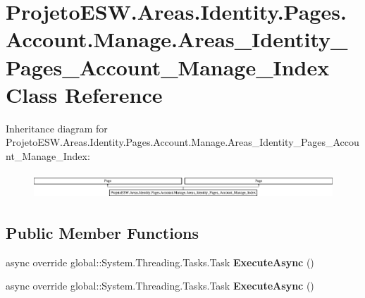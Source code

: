\hypertarget{class_projeto_e_s_w_1_1_areas_1_1_identity_1_1_pages_1_1_account_1_1_manage_1_1_areas___identity605f2cac3dc5a4ea38af9197eadd5652}{}\section{Projeto\+E\+S\+W.\+Areas.\+Identity.\+Pages.\+Account.\+Manage.\+Areas\+\_\+\+Identity\+\_\+\+Pages\+\_\+\+Account\+\_\+\+Manage\+\_\+\+Index Class Reference}
\label{class_projeto_e_s_w_1_1_areas_1_1_identity_1_1_pages_1_1_account_1_1_manage_1_1_areas___identity605f2cac3dc5a4ea38af9197eadd5652}
Inheritance diagram for Projeto\+E\+S\+W.\+Areas.\+Identity.\+Pages.\+Account.\+Manage.\+Areas\+\_\+\+Identity\+\_\+\+Pages\+\_\+\+Account\+\_\+\+Manage\+\_\+\+Index\+:\begin{figure}[H]
\begin{center}
\leavevmode
\includegraphics[height=0.965517cm]{class_projeto_e_s_w_1_1_areas_1_1_identity_1_1_pages_1_1_account_1_1_manage_1_1_areas___identity605f2cac3dc5a4ea38af9197eadd5652}
\end{center}
\end{figure}
\subsection*{Public Member Functions}
\begin{DoxyCompactItemize}
\item 
\mbox{\label{class_projeto_e_s_w_1_1_areas_1_1_identity_1_1_pages_1_1_account_1_1_manage_1_1_areas___identity605f2cac3dc5a4ea38af9197eadd5652_ae465e996de1514b83fea11bac3a0bd3c}} 
async override global\+::\+System.\+Threading.\+Tasks.\+Task {\bfseries Execute\+Async} ()
\item 
\mbox{\label{class_projeto_e_s_w_1_1_areas_1_1_identity_1_1_pages_1_1_account_1_1_manage_1_1_areas___identity605f2cac3dc5a4ea38af9197eadd5652_ae465e996de1514b83fea11bac3a0bd3c}} 
async override global\+::\+System.\+Threading.\+Tasks.\+Task {\bfseries Execute\+Async} ()
\end{DoxyCompactItemize}
